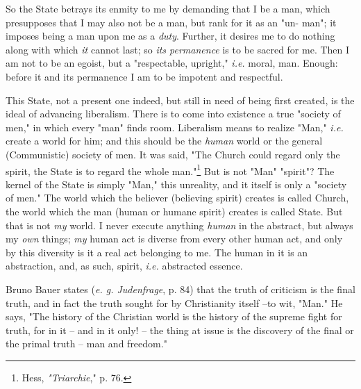 So the State betrays its enmity to me by demanding that I be a man, which 
presupposes that I may also not be a man, but rank for it as an "{}un- man"{}; 
it imposes being a man upon me as a \textit{duty}. Further, it desires me to 
do nothing along with which \textit{it} cannot last; so \textit{its 
permanence} is to be sacred for me. Then I am not to be an egoist, but a 
"{}respectable, upright,"{} \textit{i.e.} moral, man. Enough: before it and 
its permanence I am to be impotent and respectful.

This State, not a present one indeed, but still in need of being first 
created, is the ideal of advancing liberalism. There is to come into existence 
a true "{}society of men,"{} in which every "{}man"{} finds room. Liberalism 
means to realize "{}Man,"{} \textit{i.e.} create a world for him; and this 
should be the \textit{human} world or the general (Communistic) society of 
men. It was said, "{}The Church could regard only the spirit, the State is to 
regard the whole man."{}\footnote{Hess, \textit{"{}Triarchie},"{} p. 76.} But 
is not "{}Man"{} "{}spirit"{}? The kernel of the State is simply "{}Man,"{} 
this unreality, and it itself is only a "{}society of men."{} The world which 
the believer (believing spirit) creates is called Church, the world which the 
man (human or humane spirit) creates is called State. But that is not 
\textit{my} world. I never execute anything \textit{human} in the abstract, 
but always my \textit{own} things; \textit{my} human act is diverse from every 
other human act, and only by this diversity is it a real act belonging to me. 
The human in it is an abstraction, and, as such, spirit, \textit{i.e.} 
abstracted essence.

Bruno Bauer states (\textit{e. g. Judenfrage}, p. 84) that the truth of 
criticism is the final truth, and in fact the truth sought for by Christianity 
itself --to wit, "{}Man."{} He says, "{}The history of the Christian world is 
the history of the supreme fight for truth, for in it -- and in it only! -- 
the thing at issue is the discovery of the final or the primal truth -- man 
and freedom."{}

